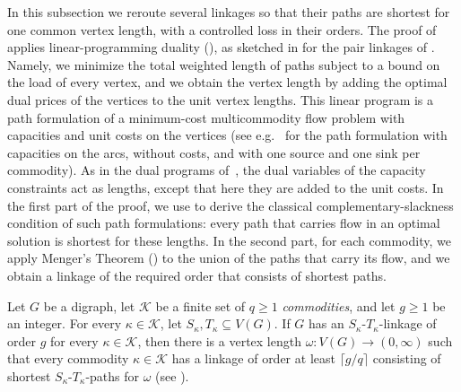\documentclass[fontsize=12pt,leading=14pt]{fullpaper}
\newcommand{\Kcal}{\mathcal{K}}
\begin{document}
In this subsection we reroute several linkages so that their paths are shortest for one common vertex length, with a controlled loss in their orders.
The proof of  applies linear-programming duality (), as sketched in  for the pair linkages of .
Namely, we minimize the total weighted length of paths subject to a bound on the load of every vertex, and we obtain the vertex length by adding the optimal dual prices of the vertices to the unit vertex lengths.
This linear program is a path formulation of a minimum-cost multicommodity flow problem with capacities and unit costs on the vertices (see e.g.~\cite[Lemma~19.1]{KorteV12} for the path formulation with capacities on the arcs, without costs, and with one source and one sink per commodity).
As in the dual programs of~\cite[Section~19.2]{KorteV12}, the dual variables of the capacity constraints act as lengths, except that here they are added to the unit costs.
In the first part of the proof, we use  to derive the classical complementary-slackness condition of such path formulations: every path that carries flow in an optimal solution is shortest for these lengths.
In the second part, for each commodity, we apply Menger's Theorem () to the union of the paths that carry its flow, and we obtain a linkage of the required order that consists of shortest paths.

\begin{lemma}\label{lem:geosystem}
  Let $G$ be a digraph, let $\Kcal$ be a finite set of $q\ge1$ \emph{commodities}, and let $g\ge1$ be an integer.
  For every $\kappa\in\Kcal$, let $S_\kappa,T_\kappa\subseteq V(G)$.
  If $G$ has an $S_\kappa$-$T_\kappa$-linkage of order $g$ for every $\kappa\in\Kcal$, then there is a vertex length $\omega\colon V(G)\to(0,\infty)$ such that every commodity $\kappa\in\Kcal$ has a linkage of order at least $\lceil g/q\rceil$ consisting of shortest $S_\kappa$-$T_\kappa$-paths for $\omega$ (see ).
\end{lemma}
\end{document}
